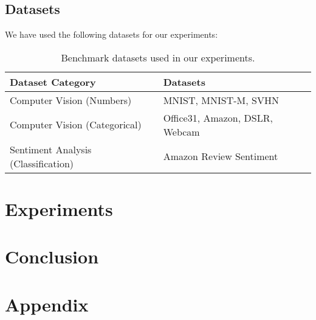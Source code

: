 \documentclass{article}
\begin{document}
\subsection{Datasets}
We have used the following datasets for our experiments:
\begin{table}[h]
  \centering
  \caption{Benchmark datasets used in our experiments.}
  \label{tab:datasets}
  \begin{tabular}{ll}
      \toprule
      \textbf{Dataset Category} & \textbf{Datasets} \\
      \midrule
      Computer Vision (Numbers)     & MNIST, MNIST-M, SVHN \\
      Computer Vision (Categorical) & Office31, Amazon, DSLR, Webcam \\
      Sentiment Analysis (Classification)  & Amazon Review Sentiment \\
      \bottomrule
  \end{tabular}
\end{table}


\section{Experiments}
\section{Conclusion}

\section*{Appendix}



\end{document}
